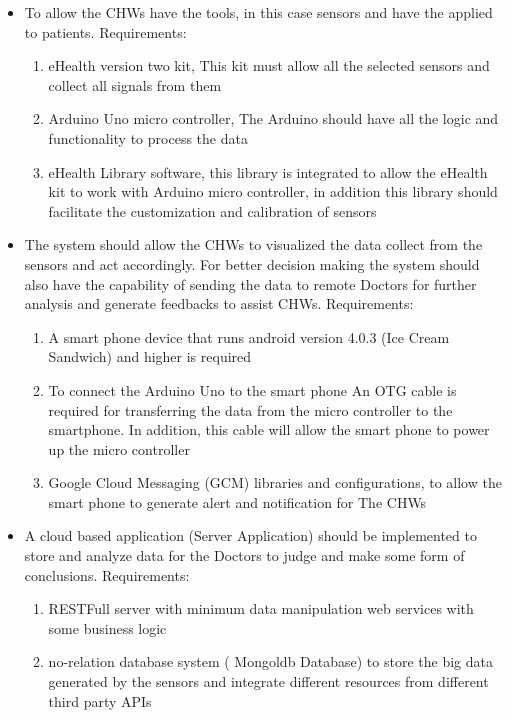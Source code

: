 \begin{itemize}
\item To allow the CHWs have the tools, in this case sensors and have the applied to patients.
Requirements:
	\begin{enumerate}
		\item eHealth version two kit, This kit must allow all the selected sensors and collect all signals from them
		\item Arduino Uno micro controller, The Arduino should have all the logic and functionality to process the data
		\item eHealth Library software, this library is integrated to allow the eHealth kit to work with Arduino micro controller, in addition this library should facilitate the customization and calibration of sensors
	\end{enumerate}
\item The system should allow the CHWs to visualized the data collect from the sensors and act accordingly. For better decision making the system should also have the capability of sending the data to remote Doctors for further analysis and generate feedbacks to assist CHWs. Requirements:
	\begin{enumerate}
		\item A smart phone device that runs android version 4.0.3 (Ice Cream Sandwich) and higher is required
		\item To connect the Arduino Uno to the smart phone An OTG cable is required for transferring the data from the micro   controller to the smartphone. In addition, this cable will allow the smart phone to power up the micro controller
		\item Google Cloud Messaging (GCM) libraries and configurations, to allow the smart phone to generate alert and notification for The CHWs
	\end{enumerate}
\item A cloud based application (Server Application) should be implemented to store and analyze data for the Doctors to judge and make some form of conclusions. Requirements:
	\begin{enumerate}
		\item RESTFull server with minimum data manipulation web services with some business logic
		\item no-relation database system ( Mongoldb Database) to store the big data generated by the sensors and integrate different resources from different third party APIs
	\end{enumerate}
\end{itemize}

